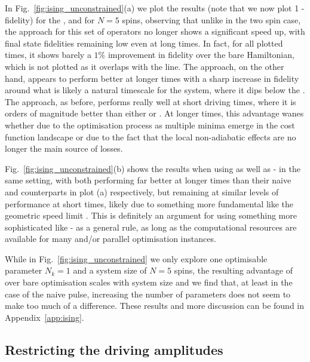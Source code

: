 In Fig.~\ref{fig:ising_unconstrained}(a) we plot the results (note that we now plot 1 - fidelity) for the  ,  and  for $N=5$ spins, observing that unlike in the two spin case, the  approach for this set of operators no longer shows a significant speed up, with final state fidelities remaining low even at long times. In fact, for all plotted times, it shows barely a $1\%$ improvement in fidelity over the bare Hamiltonian, which is not plotted as it overlaps with the  line. The  approach, on the other hand, appears to perform better at longer times with a sharp increase in fidelity around what is likely a natural timescale for the system, where it dips below the . The  approach, as before, performs really well at short driving times, where it is orders of magnitude better than either  or . At longer times, this advantage wanes whether due to the optimisation process as multiple minima emerge in the cost function landscape or due to the fact that the local non-adiabatic effects are no longer the main source of losses. 

Fig.~\ref{fig:ising_unconstrained}(b) shows the results when using  as well as - in the same setting, with both performing far better at longer times than their naive  and  counterparts in plot (a) respectively, but remaining at similar levels of performance at short times, likely due to something more fundamental like the geometric speed limit \cite{bukov_geometric_2019}. This is definitely an argument for using something more sophisticated like - as a general rule, as long as the computational resources are available for many and/or parallel optimisation instances.

While in Fig.~\ref{fig:ising_unconstrained} we only explore one optimisable parameter $N_k = 1$ and a system size of $N=5$ spins, the resulting advantage of  over bare optimisation scales with system size and we find that, at least in the case of the naive pulse, increasing the number of parameters does not seem to make too much of a difference. These results and more discussion can be found in Appendix~\ref{app:ising}.

\subsection{Restricting the driving amplitudes}\label{sec:6.2.1_restricting_amps}

